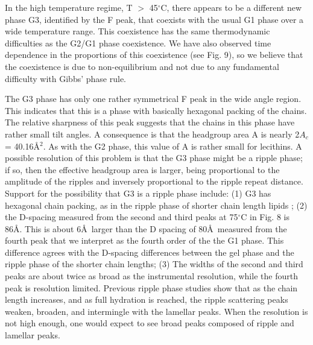 In the high temperature regime, T $>$ 45$^{\circ }$C, there appears to be a 
different new phase G3, identified by the F peak, that coexists with the usual 
G1 phase over a wide temperature range.  This coexistence has the same
thermodynamic difficulties as the G2/G1 phase coexistence.
We have also observed time dependence in the proportions of this coexistence
(see Fig. 9), so we believe that the coexistence is due to non-equilibrium and
not due to any fundamental difficulty with Gibbs' phase rule.

The G3 phase has only one rather symmetrical F peak in
the wide angle region.  This indicates that this
is a phase with basically hexagonal packing of the chains.
The relative sharpness of this peak suggests that the chains in this
phase have rather small tilt angles.  A consequence is that the
headgroup area A is nearly 2$A_c$ = 40.16\AA$^2$.  As with the G2 phase,
this value of A is rather small for lecithins.  A possible 
resolution of this problem is that the G3 phase might be a
ripple phase; if so, then the effective headgroup area is larger, being
proportional to the amplitude of the ripples and inversely
proportional to the ripple repeat distance.  
Support for the possibility that G3 is a ripple phase include: 
(1) G3 has hexagonal chain packing, as in the ripple phase of shorter chain 
length lipids \cite{HenRus91};
(2) the D-spacing measured from the second and third peaks at 75$^{\circ}$C
in Fig. 8 is 86\AA.  This is about 6\AA\ larger than the D spacing of 80\AA\ 
measured from the fourth peak that we interpret as the fourth order of the
the G1 phase.  This difference agrees with the D-spacing differences between 
the gel phase and the ripple phase of the shorter chain lengths; 
(3) The widths of the second and third peaks are about twice as broad as the
instrumental resolution, while the fourth peak is resolution limited.  Previous
ripple phase studies \cite{Wac89a} show that as the chain length increases,
and as full hydration is reached, the ripple scattering peaks weaken,
broaden, and intermingle with the lamellar peaks. When the resolution is
not high enough, one would expect to see broad peaks composed of ripple and 
lamellar peaks.

